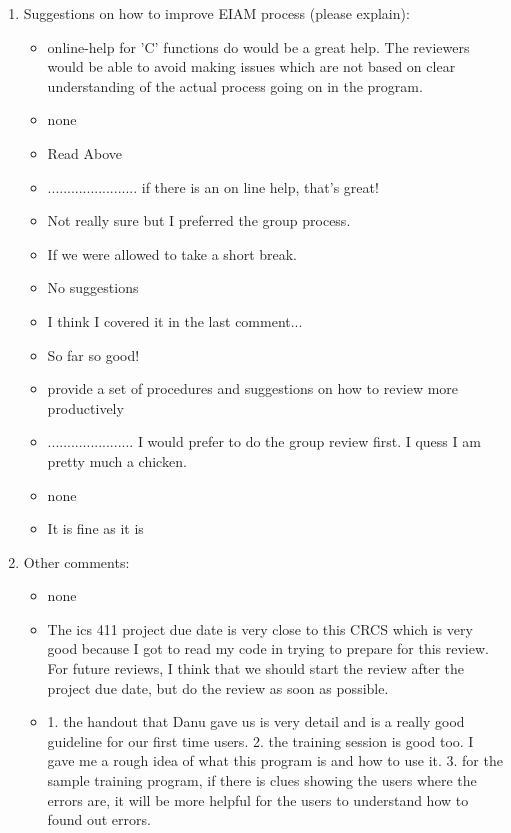 \begin{enumerate}
\begin{itemize}
\end{itemize}


\item  Suggestions on how to improve EIAM process (please explain):
\begin{itemize}
\item online-help for 'C' functions do would be a great help.  The
reviewers would be able to avoid making issues which are not based on
clear understanding of the actual process going on in the program.
\item none

\item Read Above

\item 	     .......................
if there is an on line help, that's great!

\item Not really sure but I preferred the group process.
\item If we were allowed to take a short break.
\item No suggestions
\item I think I covered it in the last comment...
\item So far so good!
\item provide a set of procedures and suggestions on how to review more productively
\item ......................
I would prefer to do the group review first.  I quess I am pretty much
a chicken.  
\item none
\item It is fine as it is
\end{itemize}


\item  Other comments:
\begin{itemize}
\item none
\item The ics 411 project due date is very close to this CRCS which is very
good because I got to read my code in trying to prepare for this
review.  For future reviews, I think that we should start the review
after the project due date, but do the review as soon as possible.
\item 1.  the handout that Danu gave us is very detail and is a really good
    guideline for our first time users.
2.  the training session is good too. I gave me a rough idea of what
    this program is and how to use it.
3.  for the sample training program, if there is clues showing the
    users where the errors are, it will be more helpful for the users
	 to understand how to found out errors.
 

\end{itemize}
\end{enumerate}
